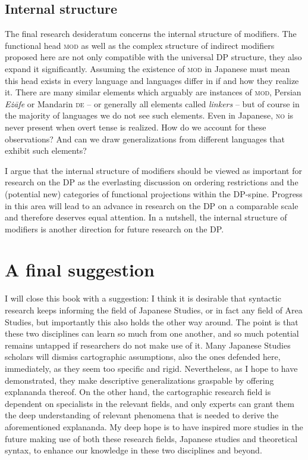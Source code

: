 \subsection{Internal structure}

The final research desideratum concerns the internal structure of modifiers. The functional head \textsc{mod} as well as the complex structure of indirect modifiers proposed here are not only compatible with the universal DP structure, they also expand it significantly. Assuming the existence of \textsc{mod} in Japanese must mean this head exists in every language and languages differ in if and how they realize it. There are many similar elements which arguably are instances of \textsc{mod}, Persian \textit{E{\.z}āfe} or Mandarin \textsc{de} -- or generally all elements called \textit{linkers} \citep{richards:2023:finding} -- but of course in the majority of languages we do not see such elements. Even in Japanese, \textsc{no} is never present when overt tense is realized. How do we account for these observations? And can we draw generalizations from different languages that exhibit such elements?

I argue that the internal structure of modifiers should be viewed as important for research on the DP as the everlasting discussion on ordering restrictions and the (potential new) categories of functional projections within the DP-spine. Progress in this area will lead to an advance in research on the DP on a comparable scale and therefore deserves equal attention. In a nutshell, the internal structure of modifiers is another direction for future research on the DP.

\section{A final suggestion}

I will close this book with a suggestion: I think it is desirable that syntactic research keeps informing the field of Japanese Studies, or in fact any field of Area Studies, but importantly this also holds the other way around. The point is that these two disciplines can learn so much from one another, and so much potential remains untapped if researchers do not make use of it. Many Japanese Studies scholars will dismiss cartographic assumptions, also the ones defended here, immediately, as they seem too specific and rigid. Nevertheless, as I hope to have demonstrated, they make descriptive generalizations graspable by offering explananda thereof. On the other hand, the cartographic research field is dependent on specialists in the relevant fields, and only experts can grant them the deep understanding of relevant phenomena that is needed to derive the aforementioned explananda. My deep hope is to have inspired more studies in the future making use of both these research fields, Japanese studies and theoretical syntax, to enhance our knowledge in these two disciplines and beyond.

